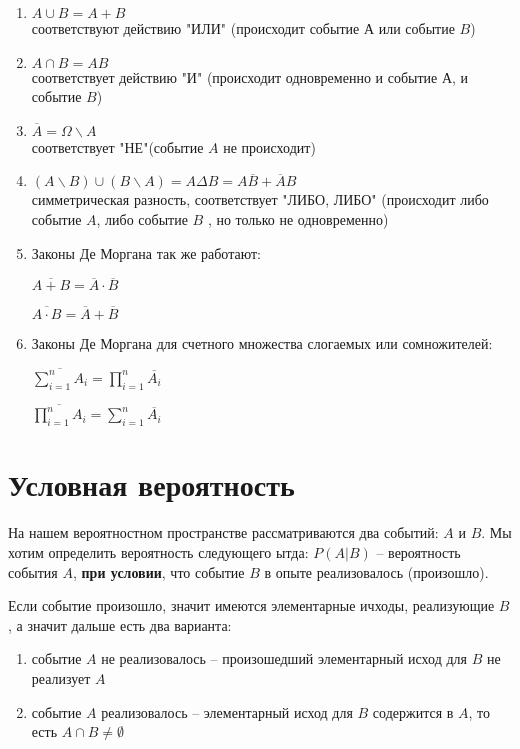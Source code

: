 \documentclass{article}
\begin{document}
\begin{enumerate}
\item $A \cup B = A + B$\\
      соответствуют действию "ИЛИ"  (происходит событие $А$ или событие $B$)

\item $A \cap B = AB$\\
      соответствует действию  "И"  (происходит одновременно и событие $А$, и событие $B$)

\item $\overline{A} = \Omega \backslash A$\\
      соответствует "НЕ"(событие $A$ не происходит)

\item $(A \backslash B) \cup (B \backslash A) = A \Delta B =  A\overline{B} + \overline{A}B$\\
      симметрическая разность, соответствует "ЛИБО, ЛИБО" (происходит либо событие $A$, либо событие $B$ , но только не одновременно)

\item Законы Де Моргана так же работают:

\quad $\overline{A + B} = \overline{A} \cdot \overline{B}$

\quad $\overline{A \cdot B} = \overline{A} + \overline{B}$

\item Законы Де Моргана для счетного множества слогаемых или сомножителей:

\quad $ \overline{\sum\limits_{i = 1}^n A_i} = \prod\limits_{i =1}^n \overline{A_i}$

\quad $\overline{\prod\limits_{i = 1}^n A_i} = \sum\limits_{i = 1}^n \overline{A_i}$

\end{enumerate}

\section{Условная вероятность}

На нашем вероятностном пространстве рассматриваются два событий: $A$ и $B$. Мы хотим определить вероятность следующего ытда: $P(A | B)$ -- вероятность события $A$, \textbf{при условии}, что событие $B$ в опыте реализовалось (произошло).

Если событие произошло, значит имеются элементарные ичходы, реализующие $B$, а значит дальше есть два варианта:

\begin{enumerate}
\item событие $A$ не реализовалось -- произошедший элементарный исход для $B$ не реализует $A$

\item событие $A$ реализовалось -- элементарный исход для $B$ содержится в $A$, то есть $A \cap B \not= \emptyset$

\end{enumerate}
\end{document}

